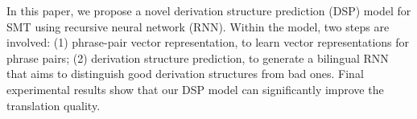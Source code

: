 In this paper, we propose a novel derivation structure prediction (DSP) model for SMT using recursive  neural network (RNN). Within the model, two steps are involved: (1) phrase-pair vector representation, to learn vector representations for phrase pairs; (2) derivation structure prediction, to generate a bilingual RNN that aims to distinguish good derivation structures from bad ones. Final experimental results show that our DSP model can significantly improve the translation quality.
